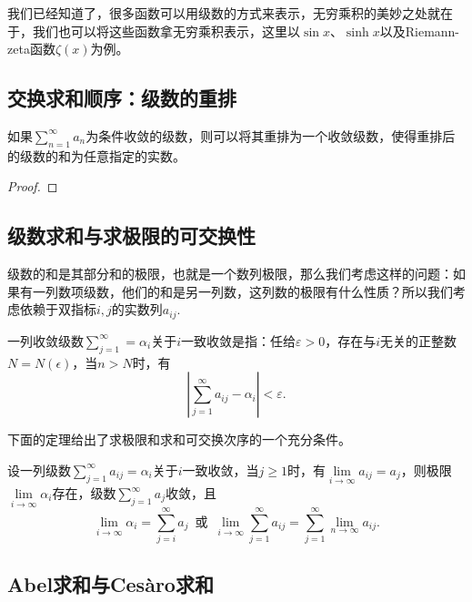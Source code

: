     我们已经知道了，很多函数可以用级数的方式来表示，无穷乘积的美妙之处就在于，我们也可以将这些函数拿无穷乘积表示，这里以\(\sin x\)、\(\sinh x\)以及Riemann-zeta函数\(\zeta(x)\)为例。
    \subsection{交换求和顺序：级数的重排}
    \begin{theorem}[Riemann]
        如果\(\sum\limits_{n=1}^{\infty}a_n\)为条件收敛的级数，则可以将其重排为一个收敛级数，使得重排后的级数的和为任意指定的实数。
    \end{theorem}
    \begin{proof}
        
    \end{proof}
    \subsection{级数求和与求极限的可交换性}
    
    级数的和是其部分和的极限，也就是一个数列极限，那么我们考虑这样的问题：如果有一列数项级数，他们的和是另一列数，这列数的极限有什么性质？所以我们考虑依赖于双指标\(i,j\)的实数列\({a_{ij}}\).
    \begin{definition}[级数的一致收敛]
        一列收敛级数\(\sum\limits_{j = 1}^{\infty}=\alpha_i\)关于\(i\)一致收敛是指：任给\(\varepsilon>0\)，存在与\(i\)无关的正整数\(N = N(\epsilon)\)，当\(n>N\)时，有\[\left|\sum_{j=1}^{\infty}a_{ij}-\alpha_i\right|<\varepsilon.\]
    \end{definition}
    
    下面的定理给出了求极限和求和可交换次序的一个充分条件。
    \begin{theorem}
        设一列级数\(\sum\limits_{j=1}^{\infty}a_{ij}=\alpha_i\)关于\(i\)一致收敛，当\(j\geq1\)时，有\(\lim\limits_{i\to\infty}a_{ij}=a_j\)，则极限\(\lim\limits_{i\to\infty}\alpha_i\)存在，级数\(\sum\limits_{j=1}^{\infty}a_j\)收敛，且\[\lim_{i\to\infty}\alpha_i = \sum_{j=i}^{\infty}a_j\enspace\text{或}\enspace\lim_{i\to\infty} \sum_{j=1}^{\infty}a_{ij} = \sum_{j=1}^{\infty}\lim_{n\to\infty}a_{ij}.\]
    \end{theorem}
    \subsection{Abel求和与Ces\`{a}ro求和}
    \begin{definition}[Abel求和]
        
    \end{definition}

